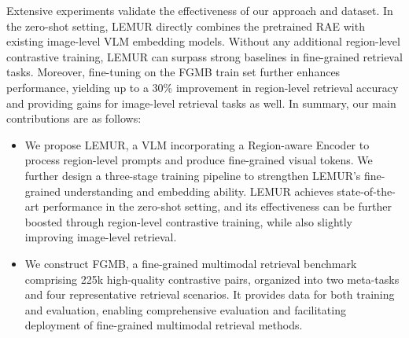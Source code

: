 Extensive experiments validate the effectiveness of our approach and dataset. In the zero-shot setting, LEMUR directly combines the pretrained RAE with existing image-level VLM embedding models. Without any additional region-level contrastive training, LEMUR can surpass strong baselines in fine-grained retrieval tasks. Moreover, fine-tuning on the FGMB train set further enhances performance, yielding up to a 30\% improvement in region-level retrieval accuracy and providing gains for image-level retrieval tasks as well. In summary, our main contributions are as follows:

\begin{itemize}[leftmargin=*, itemsep=0em] 
\item We propose LEMUR, a VLM incorporating a Region-aware Encoder to process region-level prompts and produce fine-grained visual tokens. We further design a three-stage training pipeline to strengthen LEMUR's fine-grained understanding and embedding ability. LEMUR achieves state-of-the-art performance in the zero-shot setting, and its effectiveness can be further boosted through region-level contrastive training, while also slightly improving image-level retrieval.


\item We construct FGMB, a fine-grained multimodal retrieval benchmark comprising 225k high-quality contrastive pairs, organized into two meta-tasks and four representative retrieval scenarios. %
It provides data for both training and evaluation, enabling comprehensive evaluation and facilitating deployment of fine-grained multimodal retrieval methods.
\end{itemize}